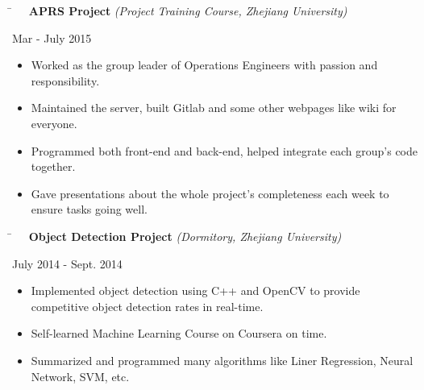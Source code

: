 \documentclass[10pt]{article} %
\begin{document}
\parbox{0.5\textwidth}{
\begin{tabbing}
\hspace{4mm} \= \kill
\>\textbf{\ \ APRS Project} \textit{(Project Training Course, Zhejiang University)}
\end{tabbing}
}
\hfill
\parbox{0.5\textwidth}{
\begin{tabbing}
Mar - July 2015
\end{tabbing}
}
\vspace{-3mm}
\begin{itemize}[leftmargin=16mm]
        \item Worked as the group leader of Operations Engineers with passion and responsibility.
        \item Maintained the server, built Gitlab and some other webpages like wiki for everyone.
        \item Programmed both front-end and back-end, helped integrate each group's code together.
        \item Gave presentations about the whole project's completeness each week to ensure tasks going well.
\end{itemize}

\parbox{0.5\textwidth}{
\begin{tabbing}
\hspace{4mm} \= \kill
\>\textbf{\ \ Object Detection Project} \textit{(Dormitory, Zhejiang University)}
\end{tabbing}
}
\hfill
\parbox{0.5\textwidth}{
\begin{tabbing}
July 2014 - Sept. 2014
\end{tabbing}
}
\vspace{-3mm}
\begin{itemize}[leftmargin=16mm]
        \item Implemented object detection using C++ and OpenCV to provide competitive object detection rates in real-time.
        \item Self-learned Machine Learning Course on Coursera on time.
        \item Summarized and programmed many algorithms like Liner Regression, Neural Network, SVM, etc.
\end{itemize}
\end{document}
